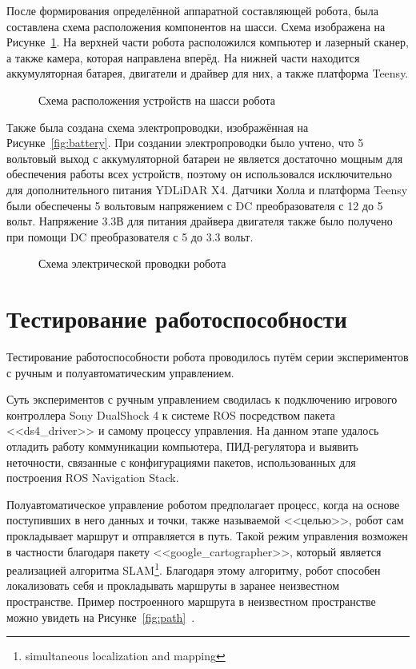 После формирования определённой аппаратной составляющей робота, была составлена схема расположения компонентов на шасси. Схема изображена на Рисунке~\cref{fig:devices}. На верхней части робота расположился компьютер и лазерный сканер, а также камера, которая направлена вперёд. На нижней части находится аккумуляторная батарея, двигатели и драйвер для них, а также платформа Teensy.

\begin{figure}[ht]
    \caption{Схема расположения устройств на шасси робота}\label{fig:devices}
\end{figure}

Также была создана схема электропроводки, изображённая на Рисунке~\cref{fig:battery}. При создании электропроводки было учтено, что 5 вольтовый выход с аккумуляторной батареи не является достаточно мощным для обеспечения работы всех устройств, поэтому он использовался исключительно для дополнительного питания YDLiDAR X4. Датчики Холла и платформа Teensy были обеспечены 5 вольтовым напряжением с DC преобразователя с 12 до 5 вольт. Напряжение 3.3В для питания драйвера двигателя также было получено при помощи DC преобразователя с 5 до 3.3 вольт.

\begin{figure}[ht]
    \caption{Схема электрической проводки робота}\label{fig:wires}
\end{figure}

\section{Тестирование работоспособности} 

Тестирование работоспособности робота проводилось путём серии экспериментов с ручным и полуавтоматическим управлением.

Суть экспериментов с ручным управлением сводилась к подключению игрового контроллера Sony DualShock 4 к системе ROS посредством пакета <<ds4\_driver>> и самому процессу управления. На данном этапе удалось отладить работу коммуникации компьютера, ПИД-регулятора и выявить неточности, связанные с конфигурациями пакетов, использованных для построения ROS Navigation Stack.

Полуавтоматическое управление роботом предполагает процесс, когда на основе поступивших в него данных и точки, также называемой <<целью>>, робот сам прокладывает маршрут и отправляется в путь. Такой режим управления возможен в частности благодаря пакету <<google\_cartographer>>, который является реализацией алгоритма SLAM\footnote{simultaneous localization and mapping}. Благодаря этому алгоритму, робот способен локализовать себя и прокладывать маршруты в заранее неизвестном пространстве. Пример построенного маршрута в неизвестном пространстве можно увидеть на Рисунке~\cref{fig:path}~\cite{path}. 

